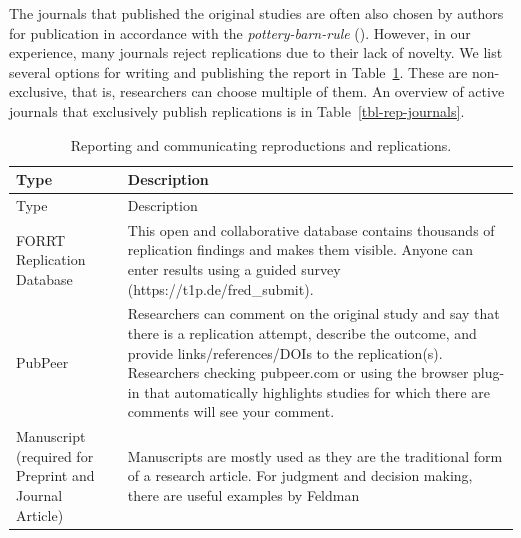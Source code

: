 \documentclass[
  letterpaper,
  DIV=11,
  openany,
  fontsize=12pt,
  parskip=half,
  headings=big,
  numbers=noenddot,
  titlepage=false]{scrreprt}
\begin{document}
The journals that published the original studies are often also chosen
by authors for publication in accordance with the
\emph{pottery-barn-rule} (). However, in our experience, many journals reject replications
due to their lack of novelty. We list several options for writing and
publishing the report in Table~\ref{tbl-reporting-options}. These are
non-exclusive, that is, researchers can choose multiple of them. An
overview of active journals that exclusively publish replications is in
Table~\ref{tbl-rep-journals}.

\begin{longtable}[]{@{}
  >{\raggedright\arraybackslash}p{}
  >{\raggedright\arraybackslash}p{}@{}}
\caption{Reporting and communicating reproductions and
replications.}\label{tbl-reporting-options}\tabularnewline
\toprule\noalign{}
\begin{minipage}[b]{\linewidth}\raggedright
Type
\end{minipage} & \begin{minipage}[b]{\linewidth}\raggedright
Description
\end{minipage} \\
\midrule\noalign{}
\endfirsthead
\toprule\noalign{}
\begin{minipage}[b]{\linewidth}\raggedright
Type
\end{minipage} & \begin{minipage}[b]{\linewidth}\raggedright
Description
\end{minipage} \\
\midrule\noalign{}
\endhead
\bottomrule\noalign{}
\endlastfoot
FORRT Replication Database & This open and collaborative database
contains thousands of replication findings and makes them visible.
Anyone can enter results using a guided survey
(https://t1p.de/fred\_submit). \\
PubPeer & Researchers can comment on the original study and say that
there is a replication attempt, describe the outcome, and provide
links/references/DOIs to the replication(s). Researchers checking
pubpeer.com or using the browser plug-in that automatically highlights
studies for which there are comments will see your comment. \\
Manuscript (required for Preprint and Journal Article) & Manuscripts are
mostly used as they are the traditional form of a research article. For
judgment and decision making, there are useful examples by Feldman

\end{longtable}
\end{document}
